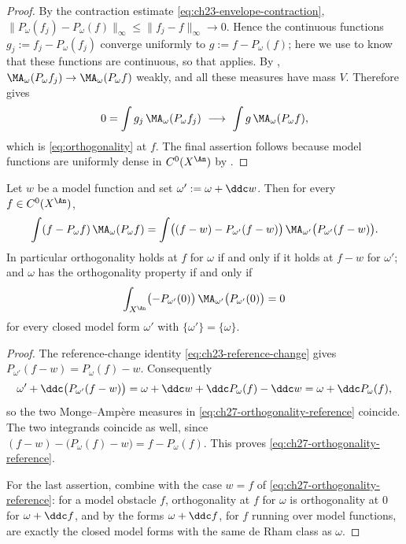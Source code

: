 \begin{proof}
By the contraction estimate \eqref{eq:ch23-envelope-contraction},
\(\lVert P_\omega(f_j)-P_\omega(f)\rVert_\infty\leq\lVert
f_j-f\rVert_\infty\to0\).  Hence the continuous functions
\(g_j:=f_j-P_\omega(f_j)\) converge uniformly to
\(g:=f-P_\omega(f)\); here we use  to know
that these functions are continuous, so that
 applies.  By
, \(\MA_\omega(P_\omega f_j)\to
\MA_\omega(P_\omega f)\) weakly, and all these measures have mass \(V\).
Therefore  gives
\[
 0=\int g_j\,\MA_\omega(P_\omega f_j)
 \ \longrightarrow\
 \int g\,\MA_\omega(P_\omega f),
\]
which is \eqref{eq:orthogonality} at \(f\).  The final assertion follows
because model functions are uniformly dense in \(C^0(X^{\An})\) by
\Cref{lem:ch23-model-density}.
\end{proof}

\begin{proposition}
\label{prop:ch27-orthogonality-reference-change}
Let \(w\) be a model function and set \(\omega':=\omega+\ddc w\).  Then for
every \(f\in C^0(X^{\An})\),
\begin{equation}\label{eq:ch27-orthogonality-reference}
 \int(f-P_\omega f)\,\MA_\omega(P_\omega f)
 =\int\bigl((f-w)-P_{\omega'}(f-w)\bigr)\,
   \MA_{\omega'}\bigl(P_{\omega'}(f-w)\bigr).
\end{equation}
In particular orthogonality holds at \(f\) for \(\omega\) if and only if it
holds at \(f-w\) for \(\omega'\); and \(\omega\) has the orthogonality
property if and only if
\[
 \int_{X^{\An}}\bigl(-P_{\omega'}(0)\bigr)\,
   \MA_{\omega'}\bigl(P_{\omega'}(0)\bigr)=0
\]
for every closed model form \(\omega'\) with \(\{\omega'\}=\{\omega\}\).
\end{proposition}

\begin{proof}
The reference-change identity \eqref{eq:ch23-reference-change} gives
\(P_{\omega'}(f-w)=P_\omega(f)-w\).  Consequently
\[
 \omega'+\ddc\bigl(P_{\omega'}(f-w)\bigr)
 =\omega+\ddc w+\ddc P_\omega(f)-\ddc w
 =\omega+\ddc P_\omega(f),
\]
so the two Monge--Amp\`ere measures in
\eqref{eq:ch27-orthogonality-reference} coincide.  The two integrands
coincide as well, since
\((f-w)-\bigl(P_\omega(f)-w\bigr)=f-P_\omega(f)\).  This proves
\eqref{eq:ch27-orthogonality-reference}.

For the last assertion, combine
 with the case \(w=f\) of
\eqref{eq:ch27-orthogonality-reference}: for a model obstacle \(f\),
orthogonality at \(f\) for \(\omega\) is orthogonality at \(0\) for
\(\omega+\ddc f\), and by \Cref{thm:ch20-ddc-exact} the forms
\(\omega+\ddc f\), for \(f\) running over model functions, are exactly the
closed model forms with the same de Rham class as \(\omega\).
\end{proof}

